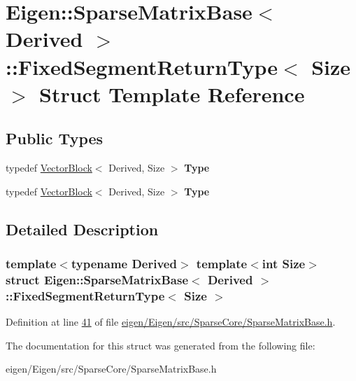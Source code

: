 \hypertarget{struct_eigen_1_1_sparse_matrix_base_1_1_fixed_segment_return_type}{}\section{Eigen\+:\+:Sparse\+Matrix\+Base$<$ Derived $>$\+:\+:Fixed\+Segment\+Return\+Type$<$ Size $>$ Struct Template Reference}
\label{struct_eigen_1_1_sparse_matrix_base_1_1_fixed_segment_return_type}
\subsection*{Public Types}
\begin{DoxyCompactItemize}
\item 
\mbox{\label{struct_eigen_1_1_sparse_matrix_base_1_1_fixed_segment_return_type_a7c77da2f9bb459d74527680fd89888b6}} 
typedef \hyperlink{group___core___module_class_eigen_1_1_vector_block}{Vector\+Block}$<$ Derived, Size $>$ {\bfseries Type}
\item 
\mbox{\label{struct_eigen_1_1_sparse_matrix_base_1_1_fixed_segment_return_type_a7c77da2f9bb459d74527680fd89888b6}} 
typedef \hyperlink{group___core___module_class_eigen_1_1_vector_block}{Vector\+Block}$<$ Derived, Size $>$ {\bfseries Type}
\end{DoxyCompactItemize}


\subsection{Detailed Description}
\subsubsection*{template$<$typename Derived$>$\newline
template$<$int Size$>$\newline
struct Eigen\+::\+Sparse\+Matrix\+Base$<$ Derived $>$\+::\+Fixed\+Segment\+Return\+Type$<$ Size $>$}



Definition at line \hyperlink{eigen_2_eigen_2src_2_sparse_core_2_sparse_matrix_base_8h_source_l00041}{41} of file \hyperlink{eigen_2_eigen_2src_2_sparse_core_2_sparse_matrix_base_8h_source}{eigen/\+Eigen/src/\+Sparse\+Core/\+Sparse\+Matrix\+Base.\+h}.



The documentation for this struct was generated from the following file\+:\begin{DoxyCompactItemize}
\item 
eigen/\+Eigen/src/\+Sparse\+Core/\+Sparse\+Matrix\+Base.\+h\end{DoxyCompactItemize}
